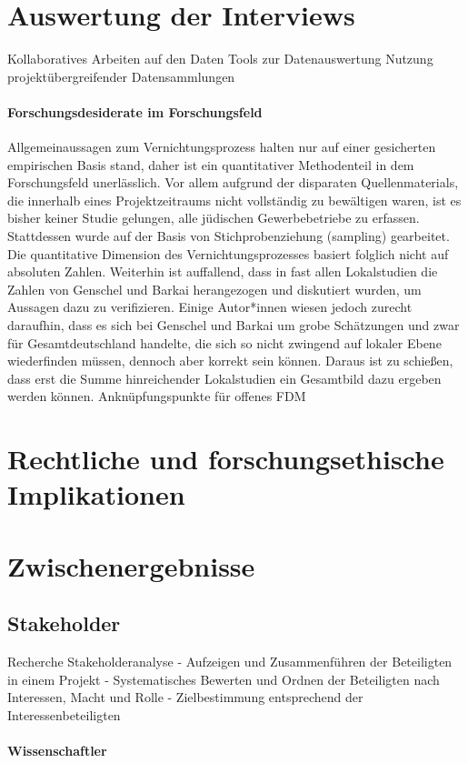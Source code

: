 \section{Auswertung der Interviews}
{Kollaboratives Arbeiten auf den Daten
Tools zur Datenauswertung
Nutzung projektübergreifender Datensammlungen
\paragraph{Forschungsdesiderate im Forschungsfeld}Allgemeinaussagen zum Vernichtungsprozess halten nur auf einer gesicherten empirischen Basis stand, daher ist ein quantitativer Methodenteil in dem Forschungsfeld unerlässlich. Vor allem aufgrund der disparaten Quellenmaterials, die innerhalb eines Projektzeitraums nicht vollständig zu bewältigen waren, ist es bisher keiner Studie gelungen, alle jüdischen Gewerbebetriebe zu erfassen. Stattdessen wurde auf der Basis von Stichprobenziehung (sampling) gearbeitet. Die quantitative Dimension des Vernichtungsprozesses basiert folglich nicht auf absoluten Zahlen.
Weiterhin ist auffallend, dass in fast allen Lokalstudien die Zahlen von Genschel und Barkai herangezogen und diskutiert wurden, um Aussagen dazu zu verifizieren. Einige Autor*innen wiesen jedoch zurecht daraufhin, dass es sich bei Genschel und Barkai um grobe Schätzungen und zwar für Gesamtdeutschland handelte, die sich so nicht zwingend auf lokaler Ebene wiederfinden müssen, dennoch aber korrekt sein können. Daraus ist zu schießen, dass erst die Summe hinreichender Lokalstudien ein Gesamtbild dazu ergeben werden können.
Anknüpfungspunkte für offenes FDM

\section{Rechtliche und forschungsethische Implikationen}
\section{Zwischenergebnisse}
\subsection{Stakeholder}
Recherche
Stakeholderanalyse
- Aufzeigen und Zusammenführen der Beteiligten in einem Projekt
- Systematisches Bewerten und Ordnen der Beteiligten nach Interessen, Macht und Rolle
- Zielbestimmung entsprechend der Interessenbeteiligten

\paragraph{Wissenschaftler}

}
